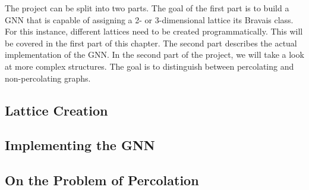 \label{sec:goalsImpl}

The project can be split into two parts. The goal of the first part is to build a GNN that is capable of assigning a 2- or 3-dimensional lattice its Bravais class. 
For this instance, different lattices need to be created programmatically. This will be covered in the first part of this chapter. The second part describes the actual implementation of the GNN.
In the second part of the project, we will take a look at more complex structures. The goal is to distinguish between percolating and non-percolating graphs.

\subsection{Lattice Creation}


\subsection{Implementing the GNN}


\subsection{On the Problem of Percolation}

